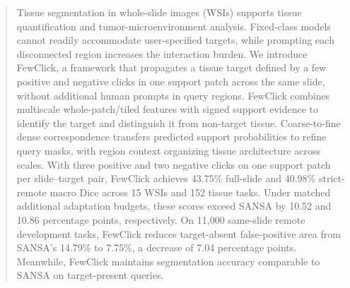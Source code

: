 \begin{abstract}
Tissue segmentation in whole-slide images (WSIs) supports tissue quantification and tumor-microenvironment analysis. Fixed-class models cannot readily accommodate user-specified targets, while prompting each disconnected region increases the interaction burden. We introduce FewClick, a framework that propagates a tissue target defined by a few positive and negative clicks in one support patch across the same slide, without additional human prompts in query regions. FewClick combines multiscale whole-patch/tiled features with signed support evidence to identify the target and distinguish it from non-target tissue. Coarse-to-fine dense correspondence transfers predicted support probabilities to refine query masks, with region context organizing tissue architecture across scales. With three positive and two negative clicks on one support patch per slide--target pair, FewClick achieves 43.75\% full-slide and 40.98\% strict-remote macro Dice across 15 WSIs and 152 tissue tasks. Under matched additional adaptation budgets, these scores exceed SANSA by 10.52 and 10.86 percentage points, respectively. On 11,000 same-slide remote development tasks, FewClick reduces target-absent false-positive area from SANSA's 14.79\% to 7.75\%, a decrease of 7.04 percentage points. Meanwhile, FewClick maintains segmentation accuracy comparable to SANSA on target-present queries.
\end{abstract}
